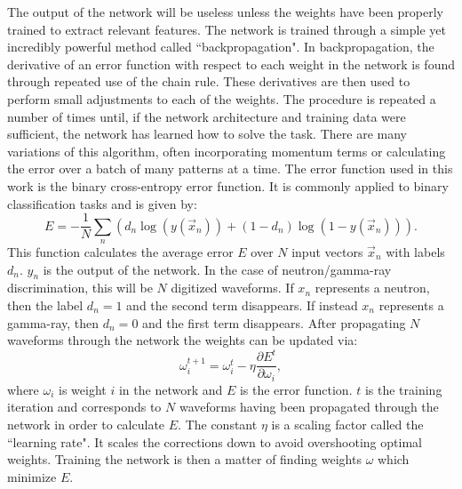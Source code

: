 \documentclass[main.tex]{subfiles}
\begin{document}
The output of the network will be useless unless the weights have been properly trained to extract relevant features. The network is trained through a simple yet incredibly powerful method called ``backpropagation". In backpropagation, the derivative of an error function with respect to each weight in the network is found through repeated use of the chain rule. These derivatives are then used to perform small adjustments to each of the weights. The procedure is repeated a number of times until, if the network architecture and training data were sufficient, the network has learned how to solve the task. There are many variations of this algorithm, often incorporating momentum terms or calculating the error over a batch of many patterns at a time.
The error function used in this work is the binary cross-entropy error function. It is commonly applied to binary classification tasks and is given by:
\begin{equation}
	E = -\frac{1}{N}\sum_n\left(	d_n\log(y(\vec x_n))+(1-d_n)\log(1-y(\vec x_n))	\right).
\end{equation}
This function calculates the average error $E$ over $N$ input vectors $\vec x_n$ with labels $d_n$. $y_n$ is the output of the network. In the case of neutron/gamma-ray discrimination, this will be $N$ digitized waveforms. If $x_n$ represents a neutron, then the label $d_n=1$ and the second term disappears. If instead $x_n$ represents a gamma-ray, then $d_n=0$ and the first term disappears.
After propagating $N$ waveforms through the network the weights can be updated via:
\begin{equation}
	\omega^{t+1}_i = \omega^{t}_i - \eta\frac{\partial E^t}{\partial \omega_i},
\end{equation}
where $\omega_i$ is weight $i$ in the network and $E$ is the error function. $t$ is the training iteration and corresponds to $N$ waveforms having been propagated through the network in order to calculate $E$. The constant $\eta$ is a scaling factor called the ``learning rate". It scales the corrections down to avoid overshooting optimal weights. Training the network is then a matter of finding weights $\omega$ which minimize $E$.
\end{document}
